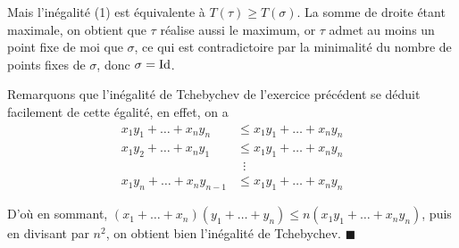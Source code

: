 \documentclass{article}
\newcommand*{\QED}{\hfill\ensuremath{\blacksquare}}%
\begin{document}
Mais l'inégalité (1) est équivalente à $T(\tau)\geq T(\sigma)$. La somme de droite étant maximale, on obtient que $\tau$ réalise aussi le maximum, or $\tau$ admet au moins un point fixe de moi que $\sigma$, ce qui est contradictoire par la minimalité du nombre de points fixes de $\sigma$, donc $\sigma = \textup{Id}$. 

Remarquons que l'inégalité de Tchebychev de l'exercice précédent se déduit facilement de cette égalité, en effet, on a 
\begin{align*}
	x_1y_1+\ldots+x_n y_n &\leq x_1y_1+\ldots+x_ny_n\\
	x_1y_2+\ldots+x_ny_1 &\leq x_1y_1+\ldots +x_ny_n\\
		     &\,\,\, \vdots \\
	x_1y_n+\ldots +x_ny_{n-1}&\leq x_1y_1+\ldots+x_ny_n
\end{align*}

D'où en sommant, $(x_1+\ldots+x_n)(y_1+\ldots+y_n)\leq n(x_1y_1+\ldots+x_ny_n)$, puis en divisant par $n^2$, on obtient bien l'inégalité de Tchebychev.
\QED
\end{document}
